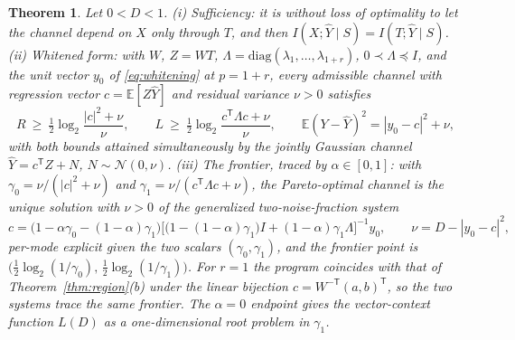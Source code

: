 \documentclass[11pt,onecolumn]{IEEEtran}
\newtheorem{theorem}{Theorem}
\newcommand{\E}{\mathbb{E}}
\newcommand{\hY}{\widehat{Y}}
\begin{document}
\begin{theorem}\label{thm:vector}
Let $0<D<1$.
(i) \emph{Sufficiency:} it is without loss of optimality to let the
channel depend on $X$ only through $T$, and then
$I(X;\hY\mid S)=I(T;\hY\mid S)$.
(ii) \emph{Whitened form:} with $W$, $Z=WT$,
$\Lambda=\mathrm{diag}(\lambda_1,\dots,\lambda_{1+r})$,
$0\prec\Lambda\preceq I$, and the unit vector $y_0$ of
\eqref{eq:whitening} at $p=1+r$, every admissible channel with
regression vector $c=\E[Z\hY]$ and residual variance $\nu>0$ satisfies
\begin{equation}
R\ \ge\ \tfrac12\log_2\frac{|c|^2+\nu}{\nu},
\qquad
L\ \ge\ \tfrac12\log_2\frac{c^{\mathsf T}\Lambda c+\nu}{\nu},
\qquad
\E(Y-\hY)^2=|y_0-c|^2+\nu,
\label{eq:vec-bounds}
\end{equation}
with both bounds attained simultaneously by the jointly Gaussian
channel $\hY=c^{\mathsf T}Z+N$, $N\sim\mathcal N(0,\nu)$.
(iii) \emph{The frontier}, traced by $\alpha\in[0,1]$: with
$\gamma_0=\nu/(|c|^2+\nu)$ and
$\gamma_1=\nu/(c^{\mathsf T}\Lambda c+\nu)$, the Pareto-optimal channel is
the unique solution with $\nu>0$ of the generalized two-noise-fraction
system
\begin{equation}
c=\bigl(1-\alpha\gamma_0-(1-\alpha)\gamma_1\bigr)
\bigl[\bigl(1-(1-\alpha)\gamma_1\bigr)I
+(1-\alpha)\gamma_1\Lambda\bigr]^{-1}y_0,
\qquad
\nu=D-|y_0-c|^2,
\label{eq:vecfoc}
\end{equation}
per-mode explicit given the two scalars $(\gamma_0,\gamma_1)$, and the
frontier point is
$\bigl(\tfrac12\log_2(1/\gamma_0),\,\tfrac12\log_2(1/\gamma_1)\bigr)$.
For $r=1$ the program coincides with that of Theorem~\ref{thm:region}(b)
under the linear bijection $c=W^{-\mathsf T}(a,b)^{\mathsf T}$, so the
two systems trace the same frontier. The $\alpha=0$ endpoint gives the
vector-context function $L(D)$ as a one-dimensional root problem in
$\gamma_1$.
\end{theorem}
\end{document}
